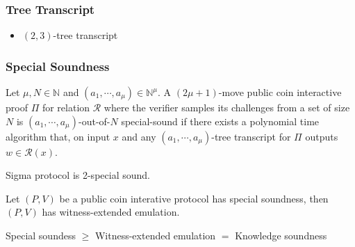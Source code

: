 \documentclass[UFT8]{beamer}
\begin{document}
\begin{frame}
    \frametitle{Tree Transcript}
    \begin{itemize}
        \item $(2, 3)$-tree transcript
    \end{itemize}
\end{frame}

\begin{frame}
    \frametitle{Special Soundness}
    \begin{definition}
        Let $\mu, N \in \mathbb{N}$ and $(a_1, \cdots, a_{\mu}) \in \mathbb{N}^\mu$.
        A $(2\mu + 1)$-move public coin interactive proof $\Pi$ for relation $\mathcal{R}$ where the verifier samples its challenges from a set of size $N$ is $(a_1, \cdots, a_{\mu})$-out-of-$N$ special-sound if there exists a polynomial time algorithm that, on input $x$ and any $(a_1, \cdots, a_{\mu})$-tree transcript for $\Pi$ outputs $w \in \mathcal{R}(x)$.
    \end{definition}

    Sigma protocol is 2-special sound.

    \begin{theorem}
        Let $(P, V)$ be a public coin interative protocol has special soundness, then $(P, V)$ has witness-extended emulation.
    \end{theorem}

    Special soundess $\ge$ Witness-extended emulation $=$ Knowledge soundness
\end{frame}
\end{document}
